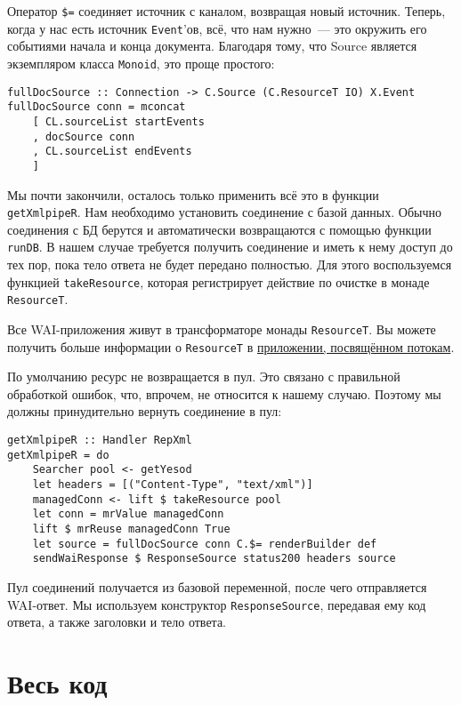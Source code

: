Оператор \lstinline'$=' соединяет источник с каналом, возвращая новый источник. Теперь, когда у нас есть источник \lstinline!Event!'ов, всё, что нам нужно~--- это окружить его событиями начала и конца документа. Благодаря тому, что Source является экземпляром класса \lstinline!Monoid!, это проще простого:

\begin{lstlisting}
fullDocSource :: Connection -> C.Source (C.ResourceT IO) X.Event
fullDocSource conn = mconcat
    [ CL.sourceList startEvents
    , docSource conn
    , CL.sourceList endEvents
    ]
\end{lstlisting}

Мы почти закончили, осталось только применить всё это в функции \lstinline!getXmlpipeR!. Нам необходимо установить соединение с базой данных. Обычно соединения с БД берутся и автоматически возвращаются с помощью функции \lstinline!runDB!. В нашем случае требуется получить соединение и иметь к нему доступ до тех пор, пока тело ответа не будет передано полностью. Для этого воспользуемся функцией \lstinline!takeResource!, которая регистрирует действие по очистке в монаде \lstinline!ResourceT!.

\begin{remark}
Все WAI-приложения живут в трансформаторе монады \lstinline!ResourceT!. Вы можете получить больше информации о \lstinline!ResourceT! в \hyperref[chap:conduit]{приложении, посвящённом потокам}.%
\end{remark}

По умолчанию ресурс не возвращается в пул. Это связано с правильной обработкой ошибок, что, впрочем, не относится к нашему случаю. Поэтому мы должны принудительно вернуть соединение в пул:

\begin{lstlisting}
getXmlpipeR :: Handler RepXml
getXmlpipeR = do
    Searcher pool <- getYesod
    let headers = [("Content-Type", "text/xml")]
    managedConn <- lift $ takeResource pool
    let conn = mrValue managedConn
    lift $ mrReuse managedConn True
    let source = fullDocSource conn C.$= renderBuilder def
    sendWaiResponse $ ResponseSource status200 headers source
\end{lstlisting}

Пул соединений получается из базовой переменной, после чего отправляется WAI-ответ. Мы используем конструктор \lstinline!ResponseSource!, передавая ему код ответа, а также заголовки и тело ответа.

\section{Весь код} %


